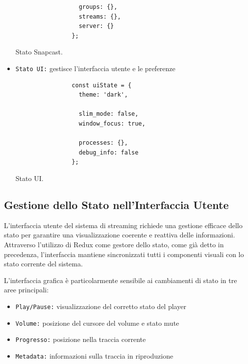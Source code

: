 \begin{itemize}
\begin{table}[H]
\begin{algorithm}[H]
\begin{verbatim}
                  groups: {},
                  streams: {},
                  server: {}
                };
              \end{verbatim}
            \end{algorithm}
            \caption{Stato Snapcast.}
            \label{tab:stato_snapcast}
          \end{table}

    \item \texttt{Stato UI:} gestisce l'interfaccia utente e le preferenze

          \begin{table}[H]
            \begin{algorithm}[H]
              \caption{}
              \BlankLine              
              \begin{verbatim}
                const uiState = {
                  theme: 'dark',
          
                  slim_mode: false,
                  window_focus: true,
          
                  processes: {},
                  debug_info: false
                };
              \end{verbatim}
            \end{algorithm}
            \caption{Stato UI.}
            \label{tab:stato_ui}
          \end{table}
\end{itemize}

\subsection{Gestione dello Stato nell'Interfaccia Utente}

L'interfaccia utente del sistema di streaming richiede una gestione efficace dello stato per garantire una visualizzazione coerente e reattiva delle informazioni. Attraverso l'utilizzo di Redux come gestore dello stato, come già detto in precedenza, l'interfaccia mantiene sincronizzati tutti i componenti visuali con lo stato corrente del sistema.

L'interfaccia grafica è particolarmente sensibile ai cambiamenti di stato in tre aree principali:

\begin{itemize}
    \item \texttt{Play/Pause:} visualizzazione del corretto stato del player
    \item \texttt{Volume:} posizione del cursore del volume e stato mute
    \item \texttt{Progresso:} posizione nella traccia corrente
    \item \texttt{Metadata:} informazioni sulla traccia in riproduzione
\end{itemize}

